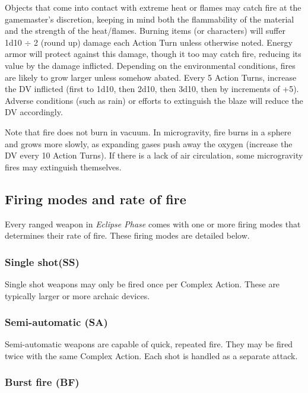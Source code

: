 Objects that come into contact with extreme heat or flames may catch fire at the gamemaster’s discretion, keeping in mind both the flammability of the material and the strength of the heat/flames. Burning items (or characters) will suffer 1d10 $\div$ 2 (round up) damage each Action Turn unless otherwise noted. Energy armor will protect against this damage, though it too may catch fire, reducing its value by the damage inflicted. Depending on the environmental conditions, fires are likely to grow larger unless somehow abated. Every 5 Action Turns, increase the DV inflicted (first to 1d10, then 2d10, then 3d10, then by increments of +5). Adverse conditions (such as rain) or efforts to extinguish the blaze will reduce the DV accordingly.

Note that fire does not burn in vacuum. In microgravity, fire burns in a sphere and grows more slowly, as expanding gases push away the oxygen (increase the DV every 10 Action Turns). If there is a lack of air circulation, some microgravity fires may extinguish themselves.


\subsection{Firing modes and rate of fire}
\label{sec:firing-modes-rate}

Every ranged weapon in \emph{Eclipse Phase} comes with one or more firing modes that determines their rate of fire. These firing modes are detailed below.

\subsubsection{Single shot(SS)}

Single shot weapons may only be fired once per Complex Action. These are typically larger or more archaic devices.

\subsubsection{Semi-automatic (SA)}

Semi-automatic weapons are capable of quick, repeated fire. They may be fired twice with the same Complex Action. Each shot is handled as a separate attack.

\subsubsection{Burst fire (BF)}

